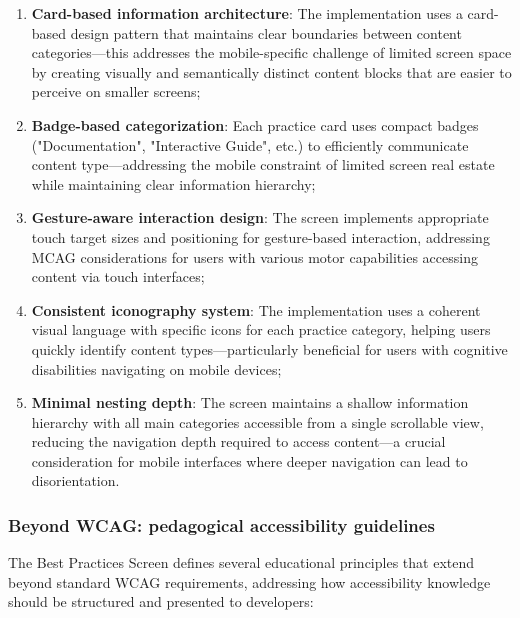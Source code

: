 \begin{enumerate}
    \item \textbf{Card-based information architecture}: The implementation uses a card-based design pattern that maintains clear boundaries between content categories—this addresses the mobile-specific challenge of limited screen space by creating visually and semantically distinct content blocks that are easier to perceive on smaller screens;
    
    \item \textbf{Badge-based categorization}: Each practice card uses compact badges ("Documentation", "Interactive Guide", etc.) to efficiently communicate content type—addressing the mobile constraint of limited screen real estate while maintaining clear information hierarchy;
    
    \item \textbf{Gesture-aware interaction design}: The screen implements appropriate touch target sizes and positioning for gesture-based interaction, addressing MCAG considerations for users with various motor capabilities accessing content via touch interfaces;
    
    \item \textbf{Consistent iconography system}: The implementation uses a coherent visual language with specific icons for each practice category, helping users quickly identify content types—particularly beneficial for users with cognitive disabilities navigating on mobile devices;
    
    \item \textbf{Minimal nesting depth}: The screen maintains a shallow information hierarchy with all main categories accessible from a single scrollable view, reducing the navigation depth required to access content—a crucial consideration for mobile interfaces where deeper navigation can lead to disorientation.
\end{enumerate}

\subsubsection{Beyond WCAG: pedagogical accessibility guidelines}

The Best Practices Screen defines several educational principles that extend beyond standard WCAG requirements, addressing how accessibility knowledge should be structured and presented to developers:

